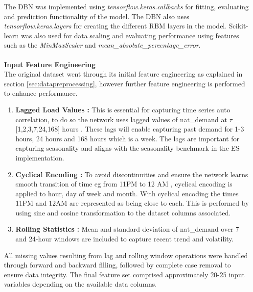 The DBN was implemented using \textit{tensorflow.keras.callbacks} for fitting, evaluating and prediction functionality of the model. The DBN also uses \textit{tensorflow.keras.layers} for creating the different RBM layers in the model. Scikit-learn was also used for data scaling and evaluating performance using features such as the \textit{MinMaxScaler} and \textit{mean\_absolute\_percentage\_error}. \\ \\
\textbf{Input Feature Engineering}
\\
The original dataset went through its initial feature engineering as explained in section \ref{sec:datapreprocessing}, however further feature engineering is performed to enhance performance.

\begin{enumerate}
	\item \textbf{Lagged Load Values : } This is essential for capturing time series auto correlation, to do so the network uses lagged values of nat\_demand at $\tau$ = [1,2,3,7,24,168] hours . These lags will enable capturing past demand for 1-3 hours, 24 hours and 168 hours which is a week. The lags are important for capturing seasonality and aligns with the seasonality benchmark in the ES implementation.
	\item \textbf{Cyclical Encoding : } To avoid discontinuities and ensure the network learns smooth transition of time eg from 11PM to 12 AM , cyclical encoding is applied to hour, day of week and month. With cyclical encoding the times 11PM and 12AM are represented as being close to each. This is performed by using sine and cosine transformation to the dataset columns associated.
	\item \textbf{Rolling Statistics : } Mean and standard deviation of nat\_demand over 7 and 24-hour windows are included to capture recent trend and volatility.
\end{enumerate}
All missing values resulting from lag and rolling window operations were handled through forward and backward filling, followed by complete case removal to ensure data integrity. The final feature set comprised approximately 20-25 input variables depending on the available data columns.
